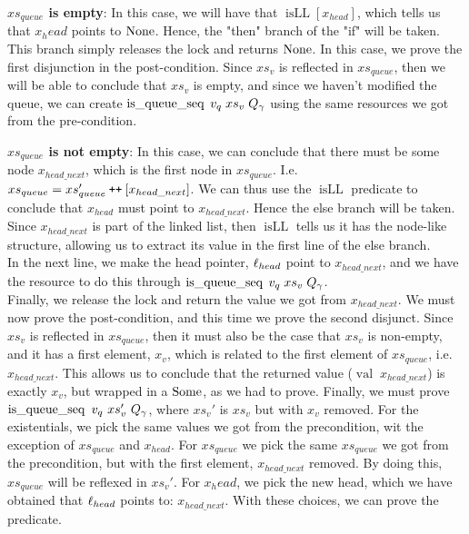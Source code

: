 \documentclass[twoside,11pt,openright]{report}
\newcommand{\isqueueseq}{\operatorname{is\_queue\_seq}}
\newcommand{\isLL}{\operatorname{isLL}}
\newcommand{\nVal}[1]{\operatorname{val} \; #1}
\newcommand\catenate{\mathbin{\text{\ttfamily\upshape ++}}}
\begin{document}
\textbf{$xs_{queue}$ is empty}: In this case, we will have that $\isLL [x_{head}]$, which tells us that $x_head$ points to $\operatorname{None}$. Hence, the "then" branch of the "if" will be taken. This branch simply releases the lock and returns $\operatorname{None}$. In this case, we prove the first disjunction in the post-condition. Since $xs_v$ is reflected in $xs_{queue}$, then we will be able to conclude that $xs_v$ is empty, and since we haven't modified the queue, we can create $\isqueueseq \; v_q \; xs_v \; Q_\gname$ using the same resources we got from the pre-condition.

\textbf{$xs_{queue}$ is not empty}: In this case, we can conclude that there must be some node $x_{head\_next}$, which is the first node in $xs_{queue}$. I.e. $xs_{queue} = xs'_{queue} \catenate [x_{head\_next}]$. We can thus use the $\isLL$ predicate to conclude that $x_{head}$ must point to $x_{head\_next}$. Hence the else branch will be taken. Since $x_{head\_next}$ is part of the linked list, then $\isLL$ tells us it has the node-like structure, allowing us to extract its value in the first line of the else branch.\\
In the next line, we make the head pointer, $\ell_{head}$ point to $x_{head\_next}$, and we have the resource to do this through $\isqueueseq \; v_q \; xs_v \; Q_\gname$.\\
Finally, we release the lock and return the value we got from $x_{head\_next}$. We must now prove the post-condition, and this time we prove the second disjunct. Since $xs_v$ is reflected in $xs_{queue}$, then it must also be the case that $xs_v$ is non-empty, and it has a first element, $x_v$, which is related to the first element of $xs_{queue}$, i.e. $x_{head\_next}$. This allows us to conclude that the returned value ($\nVal{x_{head\_next}}$) is exactly $x_v$, but wrapped in a $\operatorname{Some}$, as we had to prove. 
Finally, we must prove $\isqueueseq\ v_q\ xs_v'\ Q_\gname$, where $xs_v'$ is $xs_v$ but with $x_v$ removed. For the existentials, we pick the same values we got from the precondition, wit the exception of $xs_{queue}$ and $x_{head}$. For $xs_{queue}$ we pick the same $xs_{queue}$ we got from the precondition, but with the first element, $x_{head\_next}$ removed. By doing this, $xs_{queue}$ will be reflexed in $xs_v'$. For $x_head$, we pick the new head, which we have obtained that $\ell_{head}$ points to: $x_{head\_next}$. With these choices, we can prove the predicate.
\end{document}
